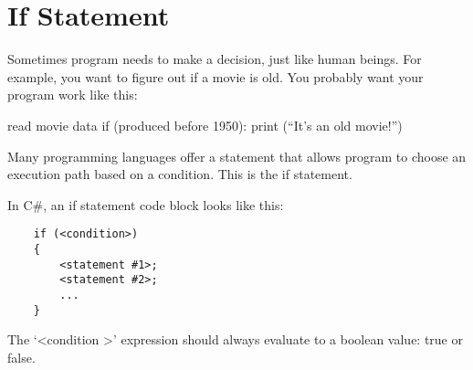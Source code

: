 \documentclass[../main.tex]{subfiles}
\begin{document}
    \section{If Statement}
Sometimes program needs to make a decision, just like human beings. For example,
you want to figure out if a movie is old. You probably want your program work
like this:


read movie data
    if (produced before 1950):
        print (``It's an old movie!'')


Many programming languages offer a statement that allows program to choose an
execution path based on a condition. This is the if statement.

In C\#, an if statement code block looks like this:

\lstset{language=Java}
\begin{lstlisting}
    if (<condition>)
    {
        <statement #1>;
        <statement #2>;
        ...
    }
\end{lstlisting}
\lstset{language=Pascal}




The `\textless condition \textgreater' expression should always evaluate to a
boolean value: true or false.
\end{document}
